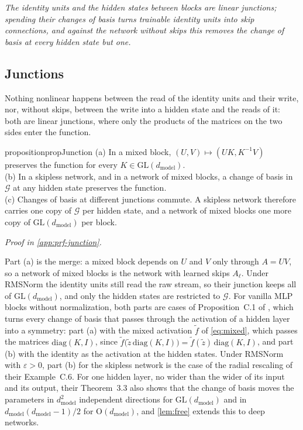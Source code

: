 \documentclass[10pt]{article}
\theoremstyle{definition}
\theoremstyle{remark}
\newcommand{\dm}{d_{\mathrm{model}}}
\newcommand{\GL}{\mathrm{GL}}
\newcommand{\Ort}{\mathrm{O}}
\newcommand{\G}{\mathcal{G}}
\newcommand{\takeaway}[1]{\noindent\textit{#1}\par\smallskip}
\newcommand{\proofin}[1]{\par\vspace{-0.4\baselineskip}\noindent\hfill{\small\itshape Proof in \cref{#1}.}\par\smallskip}
\begin{document}
\takeaway{The identity units and the hidden states between blocks are linear junctions; spending their changes of basis turns trainable identity units into skip connections, and against the network without skips this removes the change of basis at every hidden state but one.}

\subsection{Junctions}\label{sec:junctions}

Nothing nonlinear happens between the read of the identity units and their write, nor, without skips, between the write into a hidden state and the reads of it: both are linear junctions, where only the products of the matrices on the two sides enter the function.

\begin{restatable}[Junctions]{proposition}{propJunction}\label{prop:junction}
\textup{(a)} In a mixed block, $(U, V) \mapsto (UK, K^{-1}V)$ preserves the function for every $K \in \GL(\dm)$.\\
\textup{(b)} In a skipless network, and in a network of mixed blocks, a change of basis in $\G$ at any hidden state preserves the function.\\
\textup{(c)} Changes of basis at different junctions commute. A skipless network therefore carries one copy of $\G$ per hidden state, and a network of mixed blocks one more copy of $\GL(\dm)$ per block.
\end{restatable}
\proofin{app:prf-junction}

Part (a) is the merge: a mixed block depends on $U$ and $V$ only through $A = UV$, so a network of mixed blocks is the network with learned skips $A_\ell$. Under RMSNorm the identity units still read the raw stream, so their junction keeps all of $\GL(\dm)$, and only the hidden states are restricted to $\G$. For vanilla MLP blocks without normalization, both parts are cases of Proposition~C.1 of \citet{zhao2023symmetries}, which turns every change of basis that passes through the activation of a hidden layer into a symmetry: part (a) with the mixed activation $\tilde f$ of \cref{eq:mixed}, which passes the matrices $\mathrm{diag}(K, I)$, since $\tilde f\big(\tilde z\,\mathrm{diag}(K, I)\big) = \tilde f(\tilde z)\,\mathrm{diag}(K, I)$, and part (b) with the identity as the activation at the hidden states. Under RMSNorm with $\varepsilon > 0$, part (b) for the skipless network is the case of the radial rescaling of their Example~C.6. For one hidden layer, no wider than the wider of its input and its output, their Theorem~3.3 also shows that the change of basis moves the parameters in $\dm^2$ independent directions for $\GL(\dm)$ and in $\dm(\dm-1)/2$ for $\Ort(\dm)$, and \cref{lem:free} extends this to deep networks.
\end{document}
